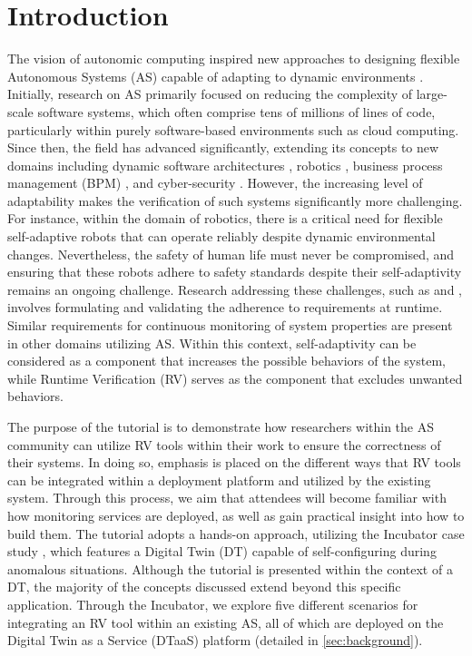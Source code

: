 \section{Introduction}

The vision of autonomic computing inspired new approaches to designing flexible Autonomous Systems (AS) capable of adapting to dynamic environments \cite{kephartVisionAutonomicComputing2003}.
Initially, research on AS primarily focused on reducing the complexity of large-scale software systems, which often comprise tens of millions of lines of code, particularly within purely software-based environments such as cloud computing.
Since then, the field has advanced significantly, extending its concepts to new domains including dynamic software architectures \cite{Albassam:2017:DARE}, robotics \cite{Cheng:2020:ACROS}, business process management (BPM) \cite{malburgApplyingMAPEKControl2023}, and cyber-security \cite{Papamartzivanos:2019:ItrusionDetection}.
However, the increasing level of adaptability makes the verification of such systems significantly more challenging.
For instance, within the domain of robotics, there is a critical need for flexible self-adaptive robots that can operate reliably despite dynamic environmental changes.
Nevertheless, the safety of human life must never be compromised, and ensuring that these robots adhere to safety standards despite their self-adaptivity remains an ongoing challenge.
Research addressing these challenges, such as \cite{Cheng:2020:ACROS} and \cite{jahanMAPEKMAPESACInteraction2020a}, involves formulating and validating the adherence to requirements at runtime.
Similar requirements for continuous monitoring of system properties are present in other domains utilizing AS.
Within this context, self-adaptivity can be considered as a component that increases the possible behaviors of the system, while Runtime Verification (RV) serves as the component that excludes unwanted behaviors.

The purpose of the tutorial is to demonstrate how researchers within the AS community can utilize RV tools within their work to ensure the correctness of their systems.
In doing so, emphasis is placed on the different ways that RV tools can be integrated within a deployment platform and utilized by the existing system.
Through this process, we aim that attendees will become familiar with how monitoring services are deployed, as well as gain practical insight into how to build them.
The tutorial adopts a hands-on approach, utilizing the Incubator case study \cite{Feng2021, Feng2022}, which features a Digital Twin (DT) capable of self-configuring during anomalous situations.
Although the tutorial is presented within the context of a DT, the majority of the concepts discussed extend beyond this specific application.
Through the Incubator, we explore five different scenarios for integrating an RV tool within an existing AS, all of which are deployed on the Digital Twin as a Service (DTaaS) platform (detailed in \cref{sec:background}).


